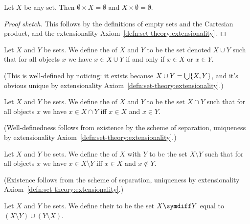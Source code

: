 \begin{theorem}
Let $X$ be any set. Then $\emptyset\times X=\emptyset$ and
$X\times\emptyset=\emptyset$. 
\end{theorem}

\begin{proof}[Proof sketch]
This follows by the definitions of empty sets and the Cartesian
product, and the extensionality Axiom~\ref{defn:set-theory:extensionality}.
\end{proof}

\begin{definition}
Let $X$ and $Y$ be sets. We define the  of $X$ and $Y$
to be the set denoted $X\cup Y$ such that for all objects $x$ we have
$x\in X\cup Y$ if and only if $x\in X$ or $x\in Y$.

(This is well-defined by noticing: it exists because
$X\cup Y=\bigcup\{X,Y\}$, and it's obvious unique by extensionality Axiom~\ref{defn:set-theory:extensionality}.)
\end{definition}

\begin{definition}
Let $X$ and $Y$ be sets. We define the  of $X$
and $Y$ to be the set $X\cap Y$ such that for all objects $x$ we have
$x\in X\cap Y$ iff $x\in X$ and $x\in Y$.

(Well-definedness follows from existence by the scheme of separation,
uniqueness by extensionality Axiom~\ref{defn:set-theory:extensionality}.)
\end{definition}

\begin{definition}\label{xboole-0:def-5}
Let $X$ and $Y$ be sets.
We define the  of $X$ with $Y$ to be the set
$X\setminus Y$ such that for all objects $x$ we have $x\in X\setminus Y$
iff $x\in X$ and $x\notin Y$.

(Existence follows from the scheme of separation, uniqueness by
extensionality Axiom~\ref{defn:set-theory:extensionality}.)
\end{definition}

\begin{definition}
Let $X$ and $Y$ be sets. We define their 
to be the set $X\symdiff Y$ equal to $(X\setminus Y)\cup(Y\setminus X)$.
\end{definition}

